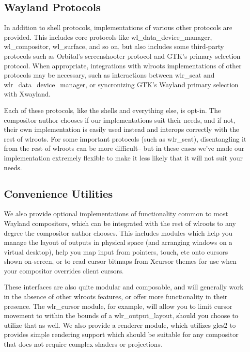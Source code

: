 \documentclass{article}
\begin{document}
\subsection{Wayland Protocols}

In addition to shell protocols, implementations of various other protocols are
provided. This includes core protocols like wl_data_device_manager,
wl_compositor, wl_surface, and so on, but also includes some third-party
protocols such as Orbital's screenshooter protocol and GTK's primary selection
protocol. When appropriate, integrations with wlroots implementations of other
protocols may be necessary, such as interactions between wlr_seat and
wlr_data_device_manager, or syncronizing GTK's Wayland primary selection with
Xwayland.

Each of these protocols, like the shells and everything else, is opt-in. The
compositor author chooses if our implementations suit their needs, and if not,
their own implementation is easily used instead and interops correctly with the
rest of wlroots. For some important protocols (such as wlr_seat), disentangling
it from the rest of wlroots can be more difficult-- but in these cases we've
made our implementation extremely flexible to make it less likely that it will
not suit your needs.

\subsection{Convenience Utilities}

We also provide optional implementations of functionality common to most Wayland
compositors, which can be integrated with the rest of wlroots to any degree the
compositor author chooses. This includes modules which help you manage the
layout of outputs in physical space (and arranging windows on a virtual
desktop), help you map input from pointers, touch, etc onto cursors shown
on-screen, or to read cursor bitmaps from Xcursor themes for use when your
compositor overrides client cursors.

These interfaces are also quite modular and composable, and will generally work
in the absence of other wlroots features, or offer more functionality in their
presence. The wlr_cursor module, for example, will allow you to limit cursor
movement to within the bounds of a wlr_output_layout, should you choose to
utilize that as well. We also provide a renderer module, which utilizes gles2 to
provides simple rendering support which should be suitable for any compositor
that does not require complex shaders or projections.
\end{document}
